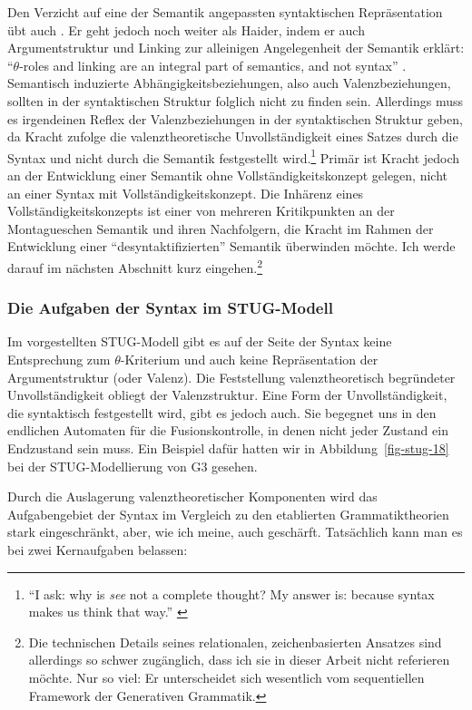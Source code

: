 {Den Verzicht auf eine der Semantik angepassten syntaktischen Repräsentation übt auch \cite{Kracht:07,Kracht:11}. Er geht jedoch noch weiter als Haider, indem er auch Argumentstruktur und Linking zur alleinigen Angelegenheit der Semantik erklärt: "`$\theta$-roles and linking are an integral part of semantics, and not syntax"' \cite[48]{Kracht:07}. Semantisch induzierte Abhängigkeitsbeziehungen, also auch Valenzbeziehungen, sollten in der syntaktischen Struktur folglich nicht zu finden sein. Allerdings muss es irgendeinen Reflex der Valenzbeziehungen in der syntaktischen Struktur geben, da Kracht zufolge die valenztheoretische Unvollständigkeit eines Satzes durch die Syntax und nicht durch die Semantik festgestellt wird.\footnote{"`I ask: why is {\it see} not a complete thought? My answer is: because syntax makes us think that way."' \cite[55]{Kracht:07}} Primär ist Kracht jedoch an der Entwicklung einer Semantik ohne Vollständigkeitskonzept gelegen, nicht an einer Syntax mit Vollständigkeitskonzept. Die Inhärenz eines Vollständigkeitskonzepts ist einer von mehreren Kritikpunkten an der Montagueschen Semantik und ihren Nachfolgern, die Kracht im Rahmen der Entwicklung einer "`desyntaktifizierten"' Semantik überwinden möchte. Ich werde darauf im nächsten Abschnitt kurz eingehen.\footnote{Die technischen Details seines relationalen, zeichenbasierten Ansatzes sind allerdings so schwer zugänglich, dass ich sie in dieser Arbeit nicht referieren möchte. Nur so viel: Er unterscheidet sich wesentlich vom sequentiellen Framework der Generativen Grammatik.} 


\subsubsection*{Die Aufgaben der Syntax im STUG-Modell}

Im vorgestellten STUG-Modell gibt es auf der Seite der Syntax keine Entsprechung zum $\theta$-Kriterium und auch keine Repräsentation der Argumentstruktur (oder Valenz). Die Feststellung valenztheoretisch begründeter Unvollständigkeit obliegt der Valenzstruktur. Eine Form der Unvollständigkeit, die syntaktisch festgestellt wird, gibt es jedoch auch. Sie begegnet uns in den endlichen Automaten für die Fusionskontrolle, in denen nicht jeder Zustand ein Endzustand sein muss. Ein Beispiel dafür hatten wir in Abbildung~\ref{fig-stug-18} bei der STUG-Modellierung von G3 gesehen.

Durch die Auslagerung valenztheoretischer Komponenten wird das Aufgabengebiet der Syntax im Vergleich zu den etablierten Grammatiktheorien stark eingeschränkt, aber, wie ich meine, auch geschärft. Tatsächlich kann man es bei zwei Kernaufgaben belassen: 

}
